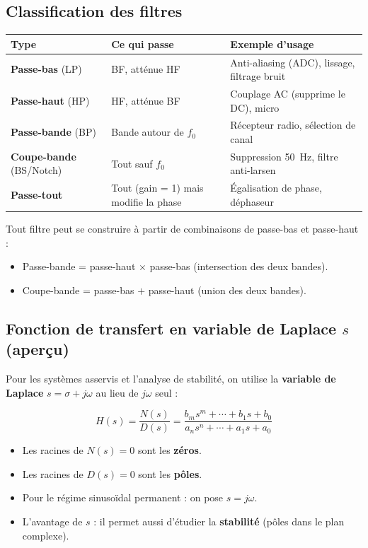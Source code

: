 \documentclass[12pt,a4paper,twoside]{book}
\begin{document}
\subsection{Classification des filtres}

\begin{center}
\renewcommand{\arraystretch}{1.5}
\begin{tabular}{lp{5cm}p{5cm}}
\toprule
\textbf{Type} & \textbf{Ce qui passe} & \textbf{Exemple d'usage} \\
\midrule
\textbf{Passe-bas} (LP) & BF, atténue HF & Anti-aliasing (ADC), lissage, filtrage bruit \\
\textbf{Passe-haut} (HP) & HF, atténue BF & Couplage AC (supprime le DC), micro \\
\textbf{Passe-bande} (BP) & Bande autour de $f_0$ & Récepteur radio, sélection de canal \\
\textbf{Coupe-bande} (BS/Notch) & Tout sauf $f_0$ & Suppression \SI{50}{Hz}, filtre anti-larsen \\
\textbf{Passe-tout} & Tout (gain = 1) mais modifie la phase & Égalisation de phase, déphaseur \\
\bottomrule
\end{tabular}
\end{center}

\begin{intuition}
Tout filtre peut se construire à partir de combinaisons de passe-bas et passe-haut :
\begin{itemize}[nosep]
\item Passe-bande = passe-haut $\times$ passe-bas (intersection des deux bandes).
\item Coupe-bande = passe-bas $+$ passe-haut (union des deux bandes).
\end{itemize}
\end{intuition}

\subsection{Fonction de transfert en variable de Laplace $s$ (aperçu)}

Pour les systèmes asservis et l'analyse de stabilité, on utilise la \textbf{variable de Laplace} $s = \sigma + j\omega$ au lieu de $j\omega$ seul :

\begin{formule}
\[
H(s) = \frac{N(s)}{D(s)} = \frac{b_m s^m + \cdots + b_1 s + b_0}{a_n s^n + \cdots + a_1 s + a_0}
\]
\begin{itemize}[nosep]
\item Les racines de $N(s) = 0$ sont les \textbf{zéros}.
\item Les racines de $D(s) = 0$ sont les \textbf{pôles}.
\item Pour le régime sinusoïdal permanent : on pose $s = j\omega$.
\item L'avantage de $s$ : il permet aussi d'étudier la \textbf{stabilité} (pôles dans le plan complexe).
\end{itemize}
\end{formule}
\end{document}
